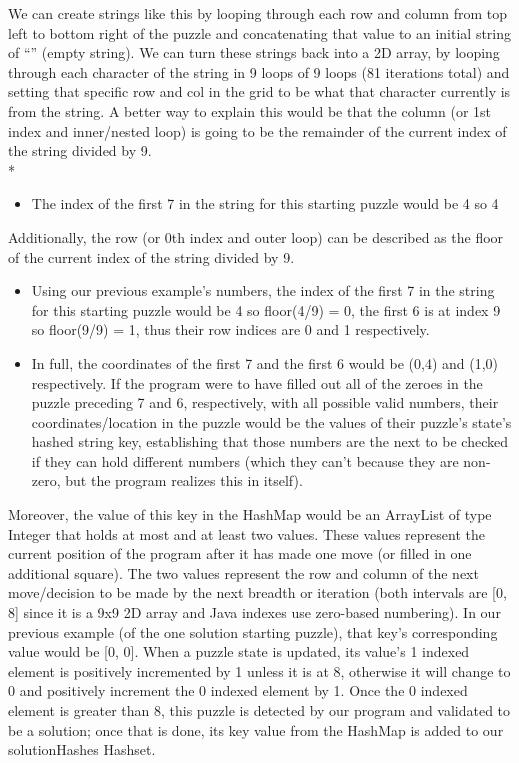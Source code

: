 \documentclass[conference]{IEEEtran}
\begin{document}
We can create strings like this by looping through each row and column from top left to bottom right of the puzzle and concatenating that value to an initial string of “” (empty string). We can turn these strings back into a 2D array, by looping through each character of the string in 9 loops of 9 loops (81 iterations total) and setting that specific row and col in the grid to be what that character currently is from the string. A better way to explain this would be that the column (or 1st index and inner/nested loop) is going to be the remainder of the current index of the string divided by 9. 
\\*

\begin{itemize}
\item The index of the first 7 in the string for this starting puzzle would be 4 so 4%
\end{itemize}
Additionally, the row (or 0th index and outer loop) can be described as the floor of the current index of the string divided by 9.
\begin{itemize}
\item Using our previous example’s numbers, the index of the first 7 in the string for this starting puzzle would be 4 so floor(4/9) = 0, the first 6 is at index 9 so floor(9/9) = 1, thus their row indices are 0 and 1 respectively.
\item In full, the coordinates of the first 7 and the first 6 would be (0,4) and (1,0) respectively. If the program were to have filled out all of the zeroes in the puzzle preceding 7 and 6, respectively, with all possible valid numbers, their coordinates/location in the puzzle would be the values of their puzzle’s state’s hashed string key, establishing that those numbers are the next to be checked if they can hold different numbers (which they can’t because they are non-zero, but the program realizes this in itself).
\end{itemize}
Moreover, the value of this key in the HashMap would be an ArrayList  of type Integer that holds at most and at least two values. These values represent the current position of the program after it has made one move (or filled in one additional square). The two values represent the row and column of the next move/decision to be made by the next breadth or iteration (both intervals are [0, 8] since it is a 9x9 2D array and Java indexes use zero-based numbering). In our previous example (of the one solution starting puzzle), that key’s corresponding value would be [0, 0]. When a puzzle state is updated, its value’s 1 indexed element is positively incremented by 1 unless it is at 8, otherwise it will change to 0 and positively increment the 0 indexed element by 1. Once the 0 indexed element is greater than 8, this puzzle is detected by our program and validated to be a solution; once that is done, its key value from the HashMap is added to our solutionHashes Hashset.
\end{document}
